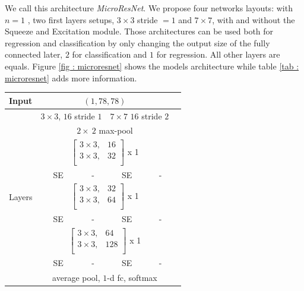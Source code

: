 \documentclass[../document.tex]{subfiles}
\begin{document}
We call this architecture \emph{MicroResNet}. We propose four networks layouts: with $n=1$ , two first layers setups, $3\times3$ stride $=1$ and $7\times7$, with and without the Squeeze and Excitation module. Those architectures can be used both for regression and classification by only changing the output size of the fully connected later, $2$ for classification and $1$ for regression. All other layers are equals. Figure \ref{fig : microresnet} shows the models architecture while table \ref{tab : microresnet} adds more information.
\begin{table}[htbp]
    \centering
        \begin{tabular}{@{}l|c|c|c|cc@{}}
        \hline
             Input   &  \multicolumn{4}{c}{$(1,78,78)$}  \\ 
            \hline 
            \multirow{12}{*}{Layers} & \multicolumn{2}{c}{$3 \times 3$, $16$ stride $1$} & \multicolumn{2}{c}{$7 \times 7$ $16$ stride $2$} \\
            \cline{2-5}
            &\multicolumn{4}{c}{$2 \times \ 2$ max-pool} \\ 
            \cline{2-5}
            &  \multicolumn{4}{c}{$\begin{bmatrix}
                3  \times 3, & 16 \\
                3  \times  3, & 32 \\  
               \end{bmatrix}$ x 1} \\ 
               \cline{2-5}
               &  SE & - & SE & -\\ 
               \cline{2-5}
               &  \multicolumn{4}{c}{$\begin{bmatrix}
                3  \times 3, & 32 \\
                3  \times  3, & 64 \\  
               \end{bmatrix}$ x 1} \\ 
               \cline{2-5}
               &  SE & - & SE & -\\ 
               \cline{2-5}

               &  \multicolumn{4}{c}{$\begin{bmatrix}
                3  \times 3, & 64 \\
                3  \times  3, & 128 \\  
               \end{bmatrix}$ x 1} \\
               \hline
               &  SE & - & SE & -\\ 
               \cline{2-5}
               &  \multicolumn{4}{c}{average pool, $1$-d fc, softmax} \\ 
               \hline
        

\end{tabular}
\end{table}
\end{document}
